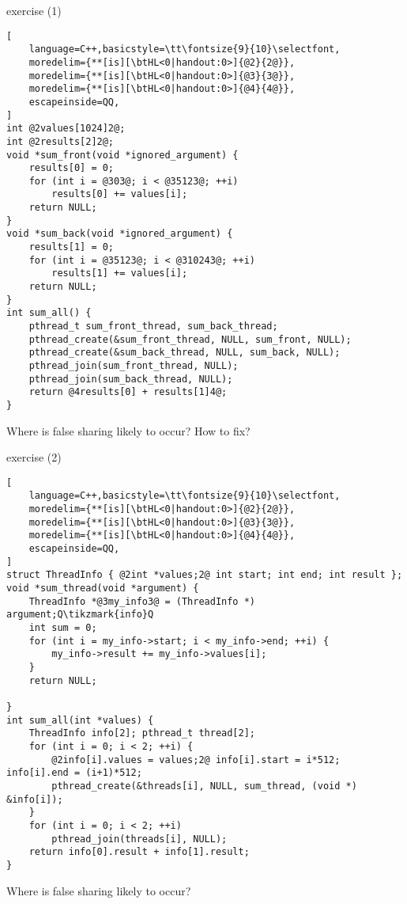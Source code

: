 \begin{frame}[fragile,label=falseSharingEx1]{exercise (1)}
\begin{lstlisting}[
    language=C++,basicstyle=\tt\fontsize{9}{10}\selectfont,
    moredelim={**[is][\btHL<0|handout:0>]{@2}{2@}},
    moredelim={**[is][\btHL<0|handout:0>]{@3}{3@}},
    moredelim={**[is][\btHL<0|handout:0>]{@4}{4@}},
    escapeinside=QQ,
]
int @2values[1024]2@;
int @2results[2]2@;
void *sum_front(void *ignored_argument) {
    results[0] = 0;
    for (int i = @303@; i < @35123@; ++i)
        results[0] += values[i];
    return NULL;
}
void *sum_back(void *ignored_argument) {
    results[1] = 0;
    for (int i = @35123@; i < @310243@; ++i)
        results[1] += values[i];
    return NULL;
}
int sum_all() {
    pthread_t sum_front_thread, sum_back_thread;
    pthread_create(&sum_front_thread, NULL, sum_front, NULL);
    pthread_create(&sum_back_thread, NULL, sum_back, NULL);
    pthread_join(sum_front_thread, NULL);
    pthread_join(sum_back_thread, NULL);
    return @4results[0] + results[1]4@;
}
\end{lstlisting}
Where is false sharing likely to occur? How to fix?
\end{frame}

\begin{frame}[fragile,label=falseSharingEx2]{exercise (2)}
\begin{lstlisting}[
    language=C++,basicstyle=\tt\fontsize{9}{10}\selectfont,
    moredelim={**[is][\btHL<0|handout:0>]{@2}{2@}},
    moredelim={**[is][\btHL<0|handout:0>]{@3}{3@}},
    moredelim={**[is][\btHL<0|handout:0>]{@4}{4@}},
    escapeinside=QQ,
]
struct ThreadInfo { @2int *values;2@ int start; int end; int result };
void *sum_thread(void *argument) {
    ThreadInfo *@3my_info3@ = (ThreadInfo *) argument;Q\tikzmark{info}Q
    int sum = 0;
    for (int i = my_info->start; i < my_info->end; ++i) {
        my_info->result += my_info->values[i];
    }
    return NULL;

}
int sum_all(int *values) {
    ThreadInfo info[2]; pthread_t thread[2];
    for (int i = 0; i < 2; ++i) {
        @2info[i].values = values;2@ info[i].start = i*512; info[i].end = (i+1)*512;
        pthread_create(&threads[i], NULL, sum_thread, (void *) &info[i]);
    }
    for (int i = 0; i < 2; ++i)
        pthread_join(threads[i], NULL);
    return info[0].result + info[1].result;
}
\end{lstlisting}
Where is false sharing likely to occur?
\end{frame}
